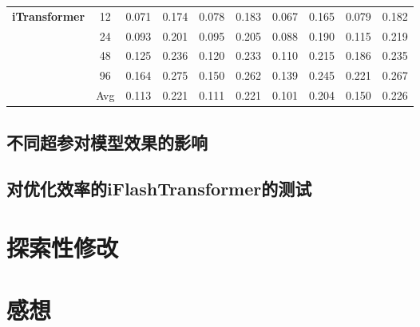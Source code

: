 \documentclass[twoside,12pt]{article}
\begin{document}
\begin{table}[htbp]
{\begin{small}
\begin{tabular}{c|c|cc|cc|cc|cc}
        \midrule
        \multirow{5}{*}{\textbf{iTransformer}}                   & 12         & 0.071                       & 0.174                       & 0.078                       & 0.183                       & 0.067 & 0.165 & 0.079 & 0.182 \\
                                                                 & 24         & 0.093                       & 0.201                       & 0.095                       & 0.205                       & 0.088 & 0.190 & 0.115 & 0.219 \\
                                                                 & 48         & 0.125                       & 0.236                       & 0.120                       & 0.233                       & 0.110 & 0.215 & 0.186 & 0.235 \\
                                                                 & 96         & 0.164                       & 0.275                       & 0.150                       & 0.262                       & 0.139 & 0.245 & 0.221 & 0.267 \\
        \cmidrule(lr){2-10}
                                                                 & Avg        & 0.113                       & 0.221                       & 0.111                       & 0.221                       & 0.101 & 0.204 & 0.150 & 0.226 \\
        \bottomrule
      \end{tabular}
    \end{small}
  }
\end{table}


\subsection{不同超参对模型效果的影响}



\subsection{对优化效率的iFlashTransformer的测试}



\section{探索性修改}


\section{感想}






\vfill
\end{document}
